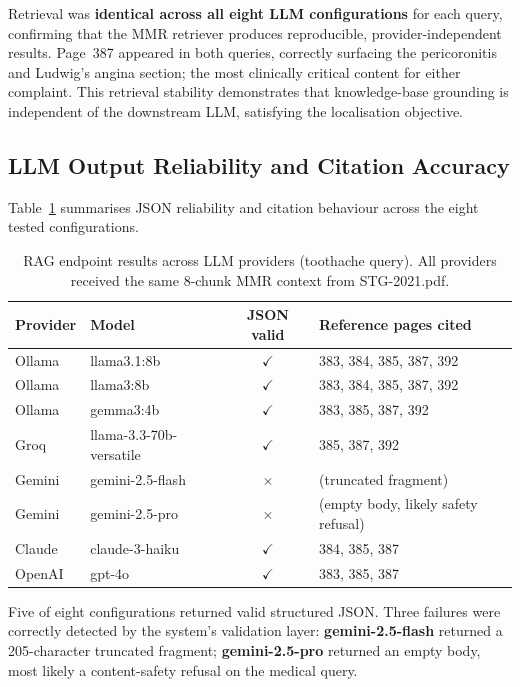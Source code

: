 \documentclass[12pt,a4paper]{report}
\begin{document}
	Retrieval was \textbf{identical across all eight LLM configurations} for each
	query, confirming that the MMR retriever produces reproducible, provider-independent
	results. Page~387 appeared in both queries, correctly surfacing the pericoronitis
	and Ludwig's angina section; the most clinically critical content for either
	complaint. This retrieval stability demonstrates that knowledge-base grounding
	is independent of the downstream LLM, satisfying the localisation objective.
	
	\subsection{LLM Output Reliability and Citation Accuracy}
	
	Table~\ref{tab:rag_reliability} summarises JSON reliability and citation
	behaviour across the eight tested configurations.
	
	\begin{table}[H]
		\centering
		\caption{RAG endpoint results across LLM providers (toothache query).
			All providers received the same 8-chunk MMR context from STG-2021.pdf.}
		\label{tab:rag_reliability}
		\small
		\renewcommand{\arraystretch}{1.2}
		\begin{tabularx}{\textwidth}{@{}l l c X@{}}
			\toprule
			\textbf{Provider} & \textbf{Model} & \textbf{JSON valid} & \textbf{Reference pages cited} \\
			\midrule
			Ollama  & llama3.1:8b             & $\checkmark$ & 383, 384, 385, 387, 392 \\
			Ollama  & llama3:8b               & $\checkmark$ & 383, 384, 385, 387, 392 \\
			Ollama  & gemma3:4b               & $\checkmark$ &  383, 385, 387, 392 \\
			Groq    & llama-3.3-70b-versatile & $\checkmark$ & 385, 387, 392 \\
			Gemini  & gemini-2.5-flash        & $\times$ & (truncated fragment) \\
			Gemini  & gemini-2.5-pro          & $\times$ & (empty body, likely safety refusal) \\
			Claude  & claude-3-haiku          & $\checkmark$ & 384, 385, 387 \\
			OpenAI  & gpt-4o                  & $\checkmark$ & 383, 385, 387 \\
			\bottomrule
		\end{tabularx}
	\end{table}
	
	Five of eight configurations returned valid structured JSON. Three failures
	were correctly detected by the system's validation layer:
	\textbf{gemini-2.5-flash} returned a 205-character truncated fragment;
	\textbf{gemini-2.5-pro} returned an empty body, most likely a content-safety
	refusal on the medical query.
	
\end{document}

